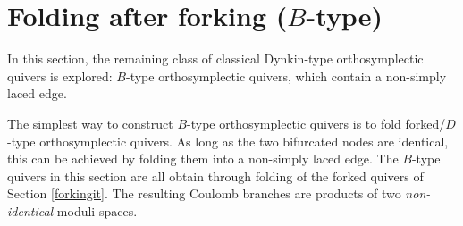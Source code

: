 \documentclass[a4paper,11pt]{article}
\begin{document}
\section{\texorpdfstring{Folding after forking ($B$-type)}{Folding after Forking (B-type)}}
\label{foldafterfork}
In this section, the remaining class of classical Dynkin-type orthosymplectic quivers is explored: $B$-type orthosymplectic quivers, which contain a non-simply laced edge. 

The simplest way to construct $B$-type orthosymplectic quivers is to fold forked/$D$-type orthosymplectic quivers. As long as the two bifurcated nodes are identical, this can be achieved by folding them into a non-simply laced edge. The $B$-type quivers in this section are all obtain through folding of the forked quivers of Section \ref{forkingit}. The resulting Coulomb branches are products of two \emph{non-identical} moduli spaces. 
% 
\end{document}
